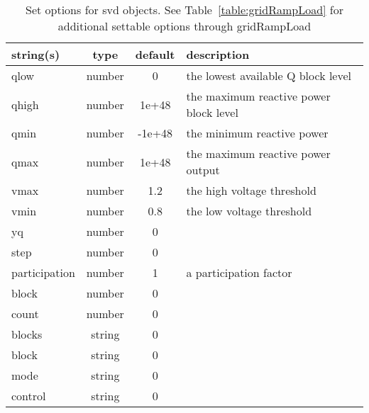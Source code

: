 \begin{table}[ht]
\centering
\begin{tabular}{p{5cm} c c p{7cm}}
\hline
string(s) & type & default & description \\
\hline
qlow & number & 0 & the lowest available Q block level\\
qhigh & number & 1e+48 & the maximum reactive power block level\\
qmin & number & -1e+48 & the minimum reactive power\\
qmax & number & 1e+48 & the maximum reactive power output\\
vmax & number & 1.2 & the high voltage threshold\\
vmin & number & 0.8 & the low voltage threshold\\
yq & number & 0 & \\
step & number & 0 & \\
participation & number & 1 & a participation factor\\
block & number & 0 & \\
count & number & 0 & \\
blocks & string & 0 & \\
block & string & 0 & \\
mode & string & 0 & \\
control & string & 0 & \\
\hline
\end{tabular}
\caption{Set options for svd objects. See Table~\ref{table:gridRampLoad} for additional settable options through gridRampLoad}
\label{table:svd}
\end{table}

